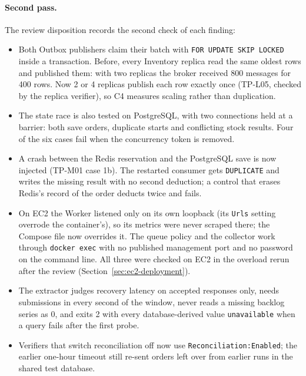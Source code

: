 \documentclass[a4paper]{report}
\begin{document}
\paragraph{Second pass.} The review disposition records the second check of
each finding:
\begin{itemize}
  \item Both Outbox publishers claim their batch with
    \texttt{FOR UPDATE SKIP LOCKED} inside a transaction. Before, every
    Inventory replica read the same oldest rows and published them: with two
    replicas the broker received 800 messages for 400 rows. Now 2 or 4
    replicas publish each row exactly once (TP-L05, checked by the replica
    verifier), so C4 measures scaling rather than duplication.
  \item The state race is also tested on PostgreSQL, with two connections
    held at a barrier: both save orders, duplicate starts and conflicting
    stock results. Four of the six cases fail when the concurrency token is
    removed.
  \item A crash between the Redis reservation and the PostgreSQL save is now
    injected (TP-M01 case 1b). The restarted consumer gets \texttt{DUPLICATE}
    and writes the missing result with no second deduction; a control that
    erases Redis's record of the order deducts twice and fails.
  \item On EC2 the Worker listened only on its own loopback (its
    \texttt{Urls} setting overrode the container's), so its metrics were never
    scraped there; the Compose file now overrides it. The queue policy and the
    collector work through \texttt{docker exec} with no published management
    port and no password on the command line. All three were checked on EC2
    in the overload rerun after the review (Section~\ref{sec:ec2-deployment}).
  \item The extractor judges recovery latency on accepted responses only,
    needs submissions in every second of the window, never reads a missing
    backlog series as 0, and exits 2 with every database-derived value
    \texttt{unavailable} when a query fails after the first probe.
  \item Verifiers that switch reconciliation off now use
    \texttt{Reconciliation:Enabled}; the earlier one-hour timeout still
    re-sent orders left over from earlier runs in the shared test database.
\end{itemize}
\end{document}
